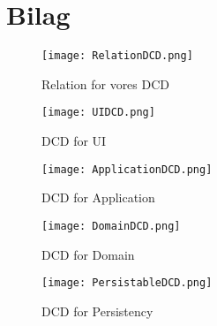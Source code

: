 \section{Bilag}

\begin{figure}[h]
    \caption{Relation for vores DCD}
    \centering
        \texttt{[image: RelationDCD.png]}
    \label{bilag:RelationDCD}
\end{figure}

\begin{sidewaysfigure}[h]
    \caption{DCD for UI}
    \centering
        \texttt{[image: UIDCD.png]}
    \label{bilag:UIDCD}
\end{sidewaysfigure}


\begin{sidewaysfigure}[h]
    \caption{DCD for Application}
    \centering
        \texttt{[image: ApplicationDCD.png]}
    \label{bilag:ApplicationDCD}
\end{sidewaysfigure}


\begin{figure}[h]
    \caption{DCD for Domain}
    \centering
        \texttt{[image: DomainDCD.png]}
    \label{bilag:DomainDCD}
\end{figure}

\begin{figure}[h]
    \caption{DCD for Persistency}
    \centering
        \texttt{[image: PersistableDCD.png]}
    \label{bilag:PersistableDCD}
\end{figure}
